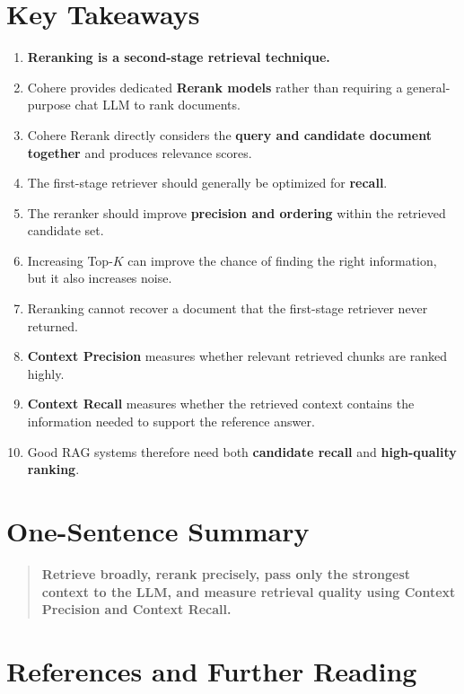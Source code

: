 \documentclass[12pt, a4paper]{article}
\begin{document}
\section{Key Takeaways}

\begin{enumerate}
    \item \textbf{Reranking is a second-stage retrieval technique.}
    \item Cohere provides dedicated \textbf{Rerank models} rather than requiring a general-purpose chat LLM to rank documents.
    \item Cohere Rerank directly considers the \textbf{query and candidate document together} and produces relevance scores.
    \item The first-stage retriever should generally be optimized for \textbf{recall}.
    \item The reranker should improve \textbf{precision and ordering} within the retrieved candidate set.
    \item Increasing Top-$K$ can improve the chance of finding the right information, but it also increases noise.
    \item Reranking cannot recover a document that the first-stage retriever never returned.
    \item \textbf{Context Precision} measures whether relevant retrieved chunks are ranked highly.
    \item \textbf{Context Recall} measures whether the retrieved context contains the information needed to support the reference answer.
    \item Good RAG systems therefore need both \textbf{candidate recall} and \textbf{high-quality ranking}.
\end{enumerate}

\section{One-Sentence Summary}

\begin{quote}
\textbf{Retrieve broadly, rerank precisely, pass only the strongest context to the LLM, and measure retrieval quality using Context Precision and Context Recall.}
\end{quote}

\section{References and Further Reading}
\end{document}
